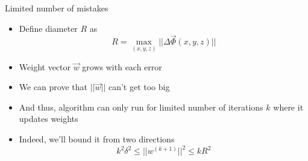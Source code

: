 \documentclass[compress]{beamer}
\begin{document}
\begin{frame}{Limited number of mistakes}

\begin{itemize}
  \item Define diameter $R$ as
    \begin{equation}
      R = \max_{(x,y,z)} || \Delta \vec \Phi (x, y, z) ||
    \end{equation}
    \pause
    \item Weight vector $\vec w$ grows with each error
    \item We can prove that $|| \vec w ||$ can't get too big
    \item And thus, algorithm can only run for limited number of
      iterations $k$ where it updates weights
    \item Indeed, we'll bound it from two directions
      \begin{equation}
        k^2 \delta^2 \leq ||w^{(k + 1)}||^2 \leq k R^2
      \end{equation}
\end{itemize}

\end{frame}
\end{document}
